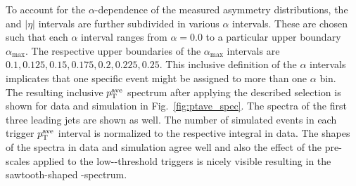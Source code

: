 \begin{table}[!t]
\centering
\caption{Overview of the $|\eta|$ and $\pt^\mathrm{ave}$ interval boundaries used for the resolution measurement.}
\label{tab:binning}
\end{table} 
To account for the $\alpha$-dependence of the measured asymmetry distributions, the \ptave and $|\eta|$ intervals are further subdivided in various $\alpha$ intervals. These are chosen such that each $\alpha$ interval ranges from $\alpha = 0.0$ to a particular upper boundary $\alpha_\mathrm{max}$. The respective upper boundaries of the $\alpha_\mathrm{max}$ intervals are $0.1, 0.125, 0.15, 0.175, 0.2, 0.225, 0.25$. This inclusive definition of the $\alpha$ intervals implicates that one specific event might be assigned to more than one $\alpha$ bin. \\
The resulting inclusive $\pt^\mathrm{ave}$ spectrum after applying the described selection is shown for data and simulation in Fig.~\ref{fig:ptave_spec}. The \pt spectra of the first three leading jets are shown as well. The number of simulated events in each trigger $\pt^\mathrm{ave}$ interval is normalized to the respective integral in data. The shapes of the spectra in data and simulation agree well and also the effect of the pre-scales applied to the low-\ptave-threshold triggers is nicely visible resulting in the sawtooth-shaped \ptave-spectrum.  
